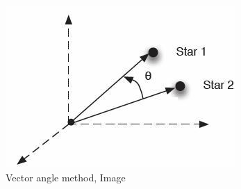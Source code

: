 \documentclass[12pt,a4paper,oneside]{article}
\begin{document}
\begin{figure}[ht]
\includegraphics[scale=0.7]{vector_angle_method.jpg}
\centering
\caption{Vector angle method, Image \citet{gottlieb1978star}}
\label{fig:angle_matching}
\end{figure}
\end{document}
